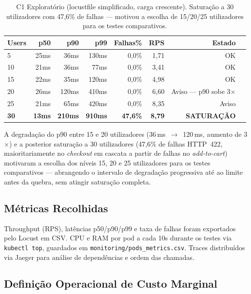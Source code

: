 \documentclass[manuscript,screen,review]{acmart}
\begin{document}
\begin{table}[t]
\caption{C1 Exploratório (locustfile simplificado, carga crescente). Saturação a 30 utilizadores com 47{,}6\% de falhas — motivou a escolha de 15/20/25 utilizadores para os testes comparativos.}
\label{tab:c1exp}
\begin{tabular}{lrrrrrrl}
\toprule
\textbf{Users} & \textbf{p50} & \textbf{p90} & \textbf{p99} & \textbf{Falhas\%} & \textbf{RPS} & \textbf{Estado} \\
\midrule
5  & 25ms & 36ms  & 130ms & 0{,}0\% & 1{,}71 & OK \\
10 & 21ms & 36ms  & 77ms  & 0{,}0\% & 3{,}41 & OK \\
15 & 22ms & 35ms  & 120ms & 0{,}0\% & 4{,}98 & OK \\
20 & 26ms & 120ms & 410ms & 0{,}0\% & 6{,}60 & Aviso — p90 sobe 3× \\
25 & 21ms & 65ms  & 420ms & 0{,}0\% & 8{,}35 & Aviso \\
\textbf{30} & \textbf{13ms} & \textbf{210ms} & \textbf{910ms} & \textbf{47{,}6\%} & \textbf{8{,}79} & \textbf{SATURAÇÃO} \\
\bottomrule
\end{tabular}
\end{table}

A degradação do p90 entre 15 e 20 utilizadores (36\,ms~$\rightarrow$~120\,ms, aumento de 3$\times$) e a posterior saturação a 30 utilizadores (47{,}6\% de falhas HTTP~422, maioritariamente no \textit{checkout} em cascata a partir de falhas no \textit{add-to-cart}) motivaram a escolha dos níveis 15, 20 e 25 utilizadores para os testes comparativos — abrangendo o intervalo de degradação progressiva até ao limite antes da quebra, sem atingir saturação completa.

\subsection{Métricas Recolhidas}

Throughput (RPS), latências p50/p90/p99 e taxa de falhas foram exportados pelo Locust em CSV. CPU e RAM por pod a cada 10s durante os testes via \texttt{kubectl top}, guardados em \texttt{monitoring/pods\_metrics.csv}. Traces distribuídos via Jaeger para análise de dependências e ordem das chamadas.

\subsection{Definição Operacional de Custo Marginal}
\end{document}
